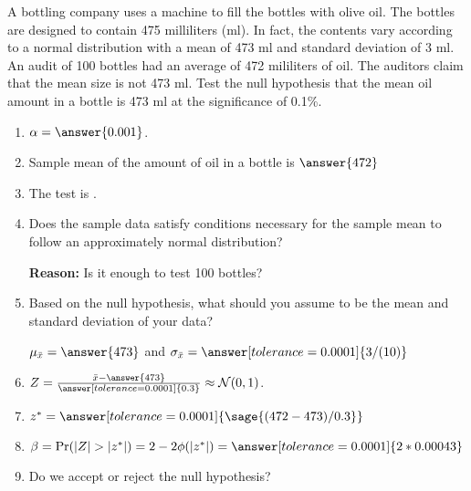 \documentclass{ximera}
\begin{document}
\begin{problem}
A bottling company uses a machine to fill the bottles with olive oil. The bottles are designed
to contain 475 milliliters (ml). In fact, the contents vary according to a normal distribution with
a mean of 473 ml and standard deviation of 3 ml. An audit of 100 bottles had an average of 472 mililiters of oil. The auditors claim that the mean size is not 473 ml. Test the null hypothesis that the mean oil amount in a bottle is 473 ml at the significance of 0.1\%.

\begin{explanation}
\begin{enumerate}
    \item $\alpha=\answer{0.001}$.
    \item Sample mean of the amount of oil in a bottle is $\answer{472}$
     \item The test is .
    \item Does the sample data satisfy conditions necessary for the sample mean to follow an
approximately normal distribution?
\begin{multipleChoice}
\end{multipleChoice}
{\bf Reason:} Is it enough to test 100 bottles? 
    
    \item Based on the null hypothesis, what should you assume to be the mean and standard deviation of your data? 

$\mu_{\bar x}=\answer{473}$ and $\sigma_{\bar x}=\answer[tolerance=0.0001]{{3/(10)}}$
    \item $Z=\frac{\bar x -\answer{473}}{\answer[tolerance=0.0001]{0.3}}\approx \mathcal N(0,1)$.
    \item $z^*=\answer[tolerance=0.0001]{\sage{(472-473)/0.3}}$
    \item $\beta=\Pr(|Z|>|z^*|)=2-2\phi(|z^*|)=\answer[tolerance=0.0001]{2*0.00043}$
    \item Do we accept or reject the null hypothesis?
    \begin{multipleChoice}
    \end{multipleChoice}
\end{enumerate}
\end{explanation}
\end{problem}
\end{document}
